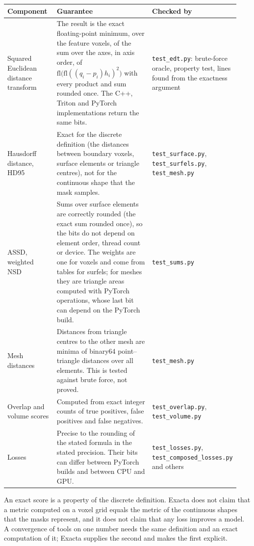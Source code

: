 \begin{longtable}{@{}
  >{\raggedright\arraybackslash}p{0.22\linewidth}
  >{\raggedright\arraybackslash}p{0.48\linewidth}
  >{\raggedright\arraybackslash}p{0.24\linewidth}@{}}
\toprule
Component & Guarantee & Checked by \\
\midrule
\endhead
Squared Euclidean distance transform &
The result is the exact floating-point minimum, over the feature voxels, of the sum over the axes,
in axis order, of $\mathrm{fl}\big(\mathrm{fl}((q_i-p_i)h_i)^2\big)$ with every product and sum
rounded once. The C++, Triton and PyTorch implementations return the same bits. &
\texttt{test\_edt.py}: brute-force oracle, property test, lines found from the exactness argument \\
Hausdorff distance, HD95 &
Exact for the discrete definition (the distances between boundary voxels, surface elements or
triangle centres), not for the continuous shape that the mask samples. &
\texttt{test\_surface.py}, \texttt{test\_surfels.py}, \texttt{test\_mesh.py} \\
ASSD, weighted NSD &
Sums over surface elements are correctly rounded (the exact sum rounded once), so the bits do
not depend on element order, thread count or device. The weights are one for voxels and come
from tables for surfels; for meshes they are triangle areas computed with PyTorch operations,
whose last bit can depend on the PyTorch build. &
\texttt{test\_sums.py} \\
Mesh distances &
Distances from triangle centres to the other mesh are minima of binary64 point--triangle
distances over all elements. This is tested against brute force, not proved. &
\texttt{test\_mesh.py} \\
Overlap and volume scores &
Computed from exact integer counts of true positives, false positives and false negatives. &
\texttt{test\_overlap.py}, \texttt{test\_volume.py} \\
Losses &
Precise to the rounding of the stated formula in the stated precision. Their bits can differ
between PyTorch builds and between CPU and GPU. &
\texttt{test\_losses.py}, \texttt{test\_composed\_losses.py} and others \\
\bottomrule
\end{longtable}

An exact score is a property of the discrete definition. Exacta does not claim that a metric
computed on a voxel grid equals the metric of the continuous shapes that the masks represent,
and it does not claim that any loss improves a model. A convergence of tools on one number
needs the same definition and an exact computation of it; Exacta supplies the second and makes
the first explicit.

